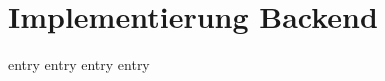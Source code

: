 \chapter{Implementierung Backend}
\label{chap:implementierung_backend}

{entry}
{entry}
{entry}
{entry}
